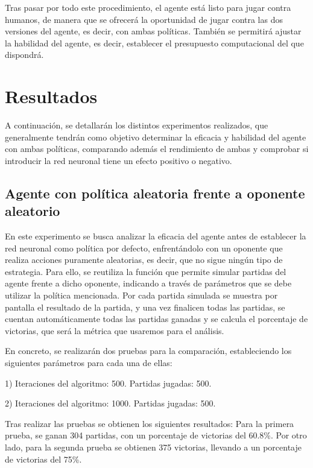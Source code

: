 \documentclass[conference,a4paper]{IEEEtran}
\begin{document}
Tras pasar por todo este procedimiento, el agente está listo para jugar contra humanos, de manera que se ofrecerá la oportunidad de 
jugar contra las dos versiones del agente, es decir, con ambas políticas. También se permitirá ajustar la habilidad del agente, es decir, 
establecer el presupuesto computacional del que dispondrá.

\section{Resultados}

A continuación, se detallarán los distintos experimentos realizados, que generalmente tendrán como objetivo determinar 
la eficacia y habilidad del agente con ambas políticas, comparando además el rendimiento de ambas y comprobar si introducir la red neuronal tiene un efecto positivo o negativo.

\subsection{Agente con política aleatoria frente a oponente aleatorio}

En este experimento se busca analizar la eficacia del agente antes de establecer la red neuronal como política por defecto, 
enfrentándolo con un oponente que realiza acciones puramente aleatorias, es decir, que no sigue ningún tipo de estrategia. 
Para ello, se reutiliza la función que permite simular partidas del agente frente a dicho oponente, indicando a través de parámetros 
que se debe utilizar la política mencionada. Por cada partida simulada se muestra por pantalla el resultado de la partida, y una vez 
finalicen todas las partidas, se cuentan automáticamente todas las partidas ganadas y se calcula el porcentaje de victorias, 
que será la métrica que usaremos para el análisis. 

En concreto, se realizarán dos pruebas para la comparación, estableciendo los siguientes parámetros para cada una de ellas:

1)	Iteraciones del algoritmo: 500. Partidas jugadas: 500.

2)	Iteraciones del algoritmo: 1000. Partidas jugadas: 500.

Tras realizar las pruebas se obtienen los siguientes resultados: Para la primera prueba, se ganan 304 partidas, con un porcentaje de victorias del 60.8\%. 
Por otro lado, para la segunda prueba se obtienen 375 victorias, llevando a un porcentaje de victorias del 75\%.
\end{document}
